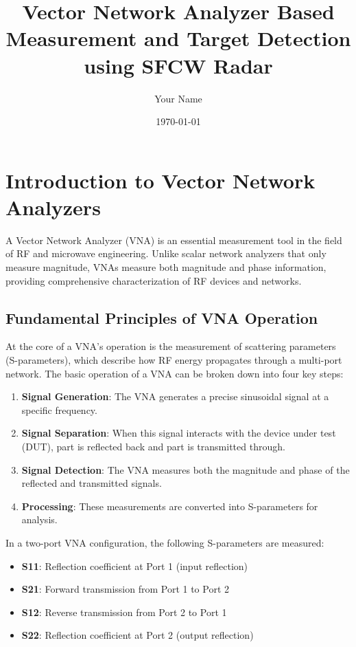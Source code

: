 \documentclass[12pt,a4paper]{article}
\title{Vector Network Analyzer Based Measurement and Target Detection using SFCW Radar}
\author{Your Name}
\date{\today}
\begin{document}
\maketitle

\tableofcontents
\newpage

\section{Introduction to Vector Network Analyzers}

A Vector Network Analyzer (VNA) is an essential measurement tool in the field of RF and microwave engineering. Unlike scalar network analyzers that only measure magnitude, VNAs measure both magnitude and phase information, providing comprehensive characterization of RF devices and networks.

\subsection{Fundamental Principles of VNA Operation}

At the core of a VNA's operation is the measurement of scattering parameters (S-parameters), which describe how RF energy propagates through a multi-port network. The basic operation of a VNA can be broken down into four key steps:

\begin{enumerate}
    \item \textbf{Signal Generation}: The VNA generates a precise sinusoidal signal at a specific frequency.
    \item \textbf{Signal Separation}: When this signal interacts with the device under test (DUT), part is reflected back and part is transmitted through.
    \item \textbf{Signal Detection}: The VNA measures both the magnitude and phase of the reflected and transmitted signals.
    \item \textbf{Processing}: These measurements are converted into S-parameters for analysis.
\end{enumerate}

In a two-port VNA configuration, the following S-parameters are measured:
\begin{itemize}
    \item \textbf{S11}: Reflection coefficient at Port 1 (input reflection)
    \item \textbf{S21}: Forward transmission from Port 1 to Port 2
    \item \textbf{S12}: Reverse transmission from Port 2 to Port 1
    \item \textbf{S22}: Reflection coefficient at Port 2 (output reflection)
\end{itemize}
\end{document}
